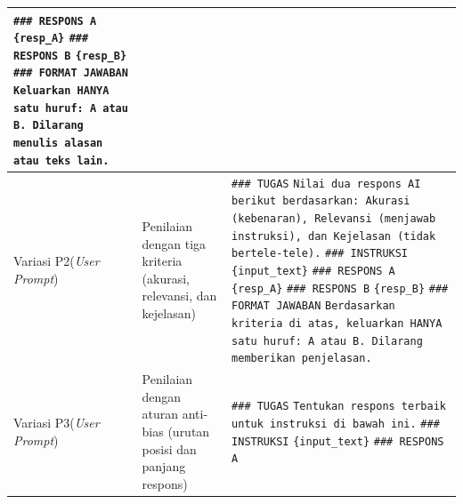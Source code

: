 \begin{enumerate}
\begin{table}[H]
\begin{minipage}{\dimexpr\textwidth-\leftmargini\relax}
{\begin{tabular}{|>{\raggedright\arraybackslash}p{2.35cm}|>{\raggedright\arraybackslash}p{2.25cm}|>{\raggedright\arraybackslash}p{7.24cm}|}
    \texttt{\#\#\# RESPONS A}\newline
    \texttt{\{resp\_A\}}\vspace{2.5pt}\newline
    \texttt{\#\#\# RESPONS B}\newline
    \texttt{\{resp\_B\}}\vspace{2.5pt}\newline
    \texttt{\#\#\# FORMAT JAWABAN}\newline
    \texttt{Keluarkan HANYA satu huruf: A atau B. Dilarang menulis alasan atau teks lain.} \\
    \hline
    Variasi P2\newline(\textit{User Prompt}) & Penilaian dengan tiga kriteria (akurasi, relevansi, dan kejelasan) & \texttt{\#\#\# TUGAS}\newline
    \texttt{Nilai dua respons AI berikut berdasarkan: Akurasi (kebenaran), Relevansi (menjawab instruksi), dan Kejelasan (tidak bertele-tele).}\vspace{2.5pt}\newline
    \texttt{\#\#\# INSTRUKSI}\newline
    \texttt{\{input\_text\}}\vspace{2.5pt}\newline
    \texttt{\#\#\# RESPONS A}\newline
    \texttt{\{resp\_A\}}\vspace{2.5pt}\newline
    \texttt{\#\#\# RESPONS B}\newline
    \texttt{\{resp\_B\}}\vspace{2.5pt}\newline
    \texttt{\#\#\# FORMAT JAWABAN}\newline
    \texttt{Berdasarkan kriteria di atas, keluarkan HANYA satu huruf: A atau B. Dilarang memberikan penjelasan.} \\
    \hline
    Variasi P3\newline(\textit{User Prompt}) & Penilaian dengan aturan anti-bias (urutan posisi dan panjang respons) & \texttt{\#\#\# TUGAS}\newline
    \texttt{Tentukan respons terbaik untuk instruksi di bawah ini.}\vspace{2.5pt}\newline
    \texttt{\#\#\# INSTRUKSI}\newline
    \texttt{\{input\_text\}}\vspace{2.5pt}\newline
    \texttt{\#\#\# RESPONS A}\newline

\end{tabular}}
\end{minipage}
\end{table}
\end{enumerate}

